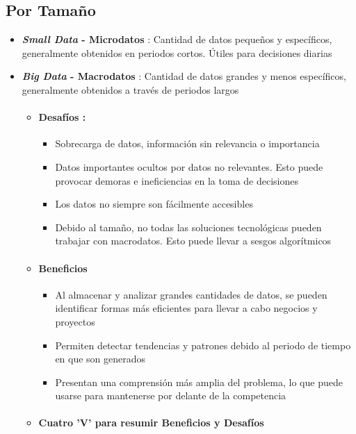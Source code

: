\subsection{Por Tamaño}
\begin{itemize}
    \item {\textbf{\textit{Small Data} - Microdatos} : Cantidad de datos pequeños y específicos, generalmente obtenidos en periodos cortos. Útiles para decisiones diarias}
    \item {\textbf{\textit{Big Data} - Macrodatos} : Cantidad de datos grandes y menos específicos, generalmente obtenidos a través de periodos largos
    \begin{itemize}
        \item {\paragraph{Desafíos : }
        \begin{itemize}
            \item {Sobrecarga de datos, información sin relevancia o importancia}
            \item {Datos importantes ocultos por datos no relevantes. Esto puede provocar demoras e ineficiencias en la toma de decisiones}
            \item {Los datos no siempre son fácilmente accesibles}
            \item {Debido al tamaño, no todas las soluciones tecnológicas pueden trabajar con macrodatos. Esto puede llevar a sesgos algorítmicos}
        \end{itemize}}
        \item {\paragraph{Beneficios}
        \begin{itemize}
            \item {Al almacenar y analizar grandes cantidades de datos, se pueden identificar formas más eficientes para llevar a cabo negocios y proyectos} 
            \item {Permiten detectar tendencias y patrones debido al periodo de tiempo en que son generados}
            \item {Presentan una comprensión más amplia del problema, lo que puede usarse para mantenerse por delante de la competencia}
        \end{itemize}}
        \item {\paragraph{Cuatro 'V' para resumir Beneficios y Desafíos}
}
\end{itemize}}
\end{itemize}
